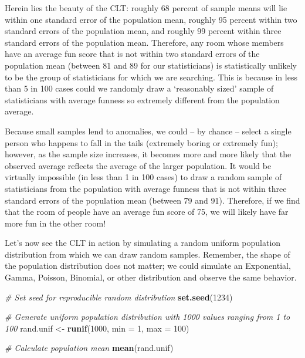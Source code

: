\documentclass[]{book}
\newenvironment{Shaded}{\begin{snugshade}}{\end{snugshade}}
\newcommand{\CommentTok}[1]{\textcolor[rgb]{0.56,0.35,0.01}{\textit{#1}}}
\newcommand{\DataTypeTok}[1]{\textcolor[rgb]{0.13,0.29,0.53}{#1}}
\newcommand{\DecValTok}[1]{\textcolor[rgb]{0.00,0.00,0.81}{#1}}
\newcommand{\KeywordTok}[1]{\textcolor[rgb]{0.13,0.29,0.53}{\textbf{#1}}}
\newcommand{\NormalTok}[1]{#1}
\newcommand{\StringTok}[1]{\textcolor[rgb]{0.31,0.60,0.02}{#1}}
\begin{document}
Herein lies the beauty of the CLT: roughly 68 percent of sample means will lie within one standard error of the population mean, roughly 95 percent within two standard errors of the population mean, and roughly 99 percent within three standard errors of the population mean. Therefore, any room whose members have an average fun score that is not within two standard errors of the population mean (between 81 and 89 for our statisticians) is statistically unlikely to be the group of statisticians for which we are searching. This is because in less than 5 in 100 cases could we randomly draw a `reasonably sized' sample of statisticians with average funness so extremely different from the population average.

Because small samples lend to anomalies, we could -- by chance -- select a single person who happens to fall in the tails (extremely boring or extremely fun); however, as the sample size increases, it becomes more and more likely that the observed average reflects the average of the larger population. It would be virtually impossible (in less than 1 in 100 cases) to draw a random sample of statisticians from the population with average funness that is not within three standard errors of the population mean (between 79 and 91). Therefore, if we find that the room of people have an average fun score of 75, we will likely have far more fun in the other room!

Let's now see the CLT in action by simulating a random uniform population distribution from which we can draw random samples. Remember, the shape of the population distribution does not matter; we could simulate an Exponential, Gamma, Poisson, Binomial, or other distribution and observe the same behavior.

\begin{Shaded}
\begin{Highlighting}[]
\CommentTok{# Set seed for reproducible random distribution}
\KeywordTok{set.seed}\NormalTok{(}\DecValTok{1234}\NormalTok{)}

\CommentTok{# Generate uniform population distribution with 1000 values ranging from 1 to 100}
\NormalTok{rand.unif <-}\StringTok{ }\KeywordTok{runif}\NormalTok{(}\DecValTok{1000}\NormalTok{, }\DataTypeTok{min =} \DecValTok{1}\NormalTok{, }\DataTypeTok{max =} \DecValTok{100}\NormalTok{)}
\end{Highlighting}
\end{Shaded}

\begin{Shaded}
\begin{Highlighting}[]
\CommentTok{# Calculate population mean}
\KeywordTok{mean}\NormalTok{(rand.unif)}
\end{Highlighting}
\end{Shaded}
\end{document}
